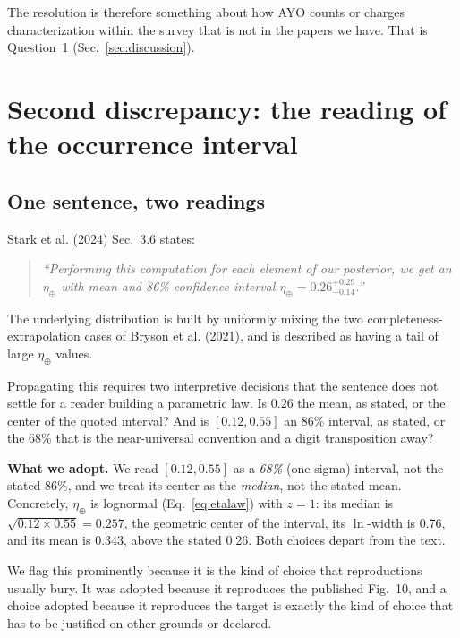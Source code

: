 \documentclass[11pt,a4paper]{article}
\begin{document}
The resolution is therefore something about how AYO counts or charges characterization within the
survey that is not in the papers we have. That is Question~1 (Sec.~\ref{sec:discussion}).

\section{Second discrepancy: the reading of the occurrence interval}
\label{sec:eta}

\subsection{One sentence, two readings}

Stark et al. (2024) Sec.~3.6 states:
\begin{quote}
\emph{``Performing this computation for each element of our posterior, we get an $\eta_\oplus$
with mean and 86\% confidence interval $\eta_\oplus = 0.26^{+0.29}_{-0.14}$.''}
\end{quote}
The underlying distribution is built by uniformly mixing the two completeness-extrapolation cases
of Bryson et al. (2021), and is described as having a tail of large $\eta_\oplus$ values.

Propagating this requires two interpretive decisions that the sentence does not settle for a
reader building a parametric law. Is $0.26$ the mean, as stated, or the center of the quoted
interval? And is $[0.12, 0.55]$ an 86\% interval, as stated, or the 68\% that is the near-universal
convention and a digit transposition away?

\textbf{What we adopt.} We read $[0.12, 0.55]$ as a \emph{68\%} (one-sigma) interval, not the
stated 86\%, and we treat its center as the \emph{median}, not the stated mean. Concretely,
$\eta_\oplus$ is lognormal (Eq.~\ref{eq:etalaw}) with $z = 1$: its median is
$\sqrt{0.12 \times 0.55} = 0.257$, the geometric center of the interval, its $\ln$-width is
0.76, and its mean is 0.343, above the stated 0.26. Both choices depart from the
text.

We flag this prominently because it is the kind of choice that reproductions usually bury. It was
adopted because it reproduces the published Fig.~10, and a choice adopted because it reproduces
the target is exactly the kind of choice that has to be justified on other grounds or declared.
\end{document}
